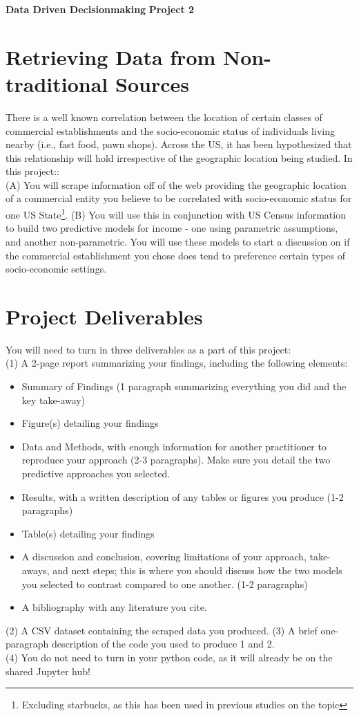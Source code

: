 \documentclass[a4paper, 11pt]{article}
\begin{document}
\noindent
\large\textbf{Data Driven Decisionmaking} \hfill \textbf{Project 2} \\

\section*{Retrieving Data from Non-traditional Sources}
There is a well known correlation between the location of certain classes of commercial establishments and the socio-economic status of individuals living nearby (i.e., fast food, pawn shops).  Across the US, it has been hypothesized that this relationship will hold irrespective of the geographic location being studied.  In this project::\\
(A) You will scrape information off of the web providing the geographic location of a commercial entity you believe to be correlated with socio-economic status for one US State\footnote{Excluding starbucks, as this has been used in previous studies on the topic}.
(B) You will use this in conjunction with US Census information to build two predictive models for income - one using parametric assumptions, and another non-parametric.  You will use these models to start a discussion on if the commercial establishment you chose does tend to preference certain types of socio-economic settings.

\section{Project Deliverables}
You will need to turn in three deliverables as a part of this project:\\
(1) A 2-page report summarizing your findings, including the following elements:
\begin{itemize}
\item Summary of Findings (1 paragraph summarizing everything you did and the key take-away)
\item Figure(s) detailing your findings
\item Data and Methods, with enough information for another practitioner to reproduce your approach (2-3 paragraphs).  Make sure you detail the two predictive approaches you selected.
\item Results, with a written description of any tables or figures you produce (1-2 paragraphs)
\item Table(s) detailing your findings
\item A discussion and conclusion, covering limitations of your approach, take-aways, and next steps; this is where you should discuss how the two models you selected to contrast compared to one another. (1-2 paragraphs)
\item A bibliography with any literature you cite.
\end{itemize}
(2) A CSV dataset containing the scraped data you produced.
(3) A brief one-paragraph description of the code you used to produce 1 and 2.\\
(4) You do not need to turn in your python code, as it will already be on the shared Jupyter hub!\\
\end{document}
